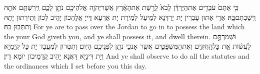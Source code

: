{כִּ֤י אַתֶּם֙ עֹבְרִ֣ים אֶת\maqqaf הַיַּרְדֵּ֔ן לָבֹא֙ לָרֶ֣שֶׁת אֶת\maqqaf הָאָ֔רֶץ אֲשֶׁר\maqqaf יְהֹוָ֥ה אֱלֹהֵיכֶ֖ם נֹתֵ֣ן לָכֶ֑ם וִֽירִשְׁתֶּ֥ם אֹתָ֖הּ וִֽישַׁבְתֶּם\maqqaf בָּֽהּ׃}
{אֲרֵי אַתּוּן עָבְרִין יָת יַרְדְּנָא לְמֵיעַל לְמֵירַת יָת אַרְעָא דַּייָ אֱלָהֲכוֹן יָהֵיב לְכוֹן וְתֵירְתוּן יָתַהּ וְתִתְּבוּן בַּהּ׃}
{For ye are to pass over the Jordan to go in to possess the land which the \lord\space your God giveth you, and ye shall possess it, and dwell therein.}{}
{וּשְׁמַרְתֶּ֣ם לַעֲשׂ֔וֹת אֵ֥ת כׇּל\maqqaf הַֽחֻקִּ֖ים וְאֶת\maqqaf הַמִּשְׁפָּטִ֑ים אֲשֶׁ֧ר אָנֹכִ֛י נֹתֵ֥ן לִפְנֵיכֶ֖ם הַיּֽוֹם׃}
{וְתִטְּרוּן לְמֶעֱבַד יָת כָּל קְיָמַיָּא וְיָת דִּינַיָּא דַּאֲנָא יָהֵיב קֳדָמֵיכוֹן יוֹמָא דֵין׃}
{And ye shall observe to do all the statutes and the ordinances which I set before you this day.}{}


